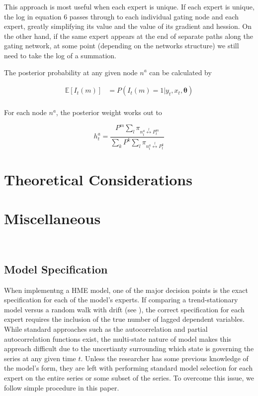 \documentclass[12pt]{article}
\begin{document}
This approach is most useful when each expert is unique. If each expert is
unique, the log in equation 6 passes through to each individual gating node
and each expert, greatly simplifying its value and the value of its gradient
and hession. On the other hand, if the same expert appears at the end of
separate paths along the gating network, at some point (depending on the
networks structure) we still need to take the log of a summation.

The posterior probability at any given node $n^{a}$ can be calculated by

\begin{equation} \label{eq:posteriorexpert}
  \begin{split}
    \mathbb{E}\left[I_{t}(m)\right] & = P(I_{t}(m)=1|y_{t},x_{t},\boldsymbol{\theta}) \\
  \end{split}
\end{equation}

For each node $n^{a}$, the posterior weight works out to

\begin{equation} \label{eq:posteriornode}
    h_{t}^{a} = \frac{P^{m}\sum_{l}\pi_{n^{a}_{t}\overset{l}{\longleftrightarrow} P^{m}_{t}}}{\sum_{k}P^{k}\sum_{l}\pi_{n^{a}_{t}\overset{l}{\longleftrightarrow} P^{k}_{t}}}
\end{equation}




\section{Theoretical Considerations}


\section{Miscellaneous}

\

\subsection{Model Specification}
When implementng a HME model, one of the major decision points is the exact specification for each of the model's experts. If comparing a trend-stationary model versus a random walk with drift (see \cite{HuertaJiangTanner2003}), the correct specification for each expert requires the inclusion of the true number of lagged dependent variables. While standard approaches such as the autocorrelation and partial autocorrelation functions exist, the multi-state nature of model makes this appreach difficult due to the uncertianty surrounding which state is governing the series at any given time $t$. Unless the researcher has some previous knowledge of the model's form, they are left with performing standard model selection for each expert on the entire series or some subset of the series. To overcome this issue, we follow simple procedure in this paper.
\end{document}
